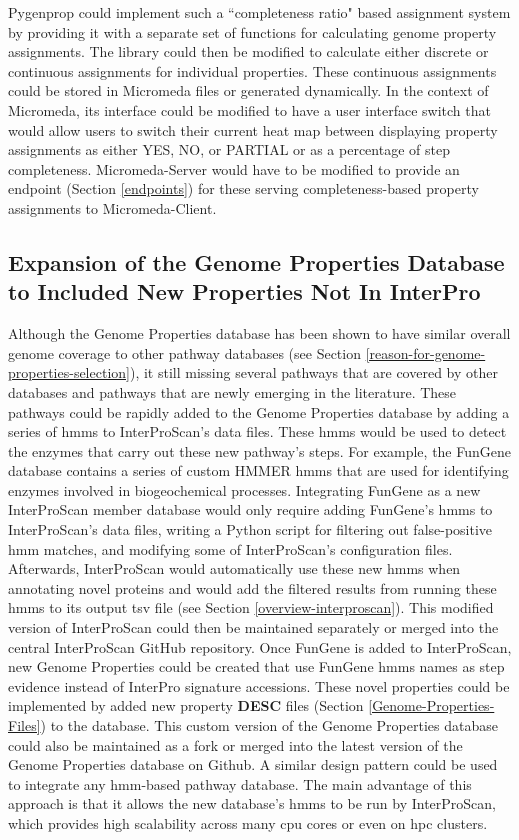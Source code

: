 Pygenprop could implement such a ``completeness ratio" based assignment system by providing it with a separate set of functions for calculating genome property assignments. The library could then be modified to calculate either discrete or continuous assignments for individual properties. These continuous assignments could be stored in Micromeda files or generated dynamically. In the context of Micromeda, its interface could be modified to have a user interface switch that would allow users to switch their current heat map between displaying property assignments as either YES, NO, or PARTIAL or as a percentage of step completeness. Micromeda-Server would have to be modified to provide an endpoint (Section \ref{endpoints}) for these serving completeness-based property assignments to Micromeda-Client.

\subsection{Expansion of the Genome Properties Database to Included New Properties Not In InterPro}

Although the Genome Properties database has been shown to have similar overall genome coverage to other pathway databases (see Section \ref{reason-for-genome-properties-selection}), it still missing several pathways that are covered by other databases and pathways that are newly emerging in the literature. These pathways could be rapidly added to the Genome Properties database by adding a series of \gls{hmm}s \cite{eddy2011accelerated} to InterProScan's data files. These \gls{hmm}s would be used to detect the enzymes that carry out these new pathway's steps. For example, the FunGene \cite{fish2013fungene} database contains a series of custom HMMER \cite{eddy2011accelerated} \gls{hmm}s that are used for identifying enzymes involved in biogeochemical processes. Integrating FunGene as a new InterProScan member database would only require adding FunGene's \gls{hmm}s to InterProScan's data files, writing a Python script for filtering out false-positive \gls{hmm} matches, and modifying some of InterProScan's configuration files. Afterwards, InterProScan would automatically use these new \gls{hmm}s when annotating novel proteins and would add the filtered results from running these \gls{hmm}s to its output \gls{tsv} file (see Section \ref{overview-interproscan}). This modified version of InterProScan could then be maintained separately or merged into the central InterProScan GitHub repository. Once FunGene is added to InterProScan, new Genome Properties could be created that use FunGene \gls{hmm}s names as step evidence instead of InterPro signature accessions. These novel properties could be implemented by added new property \textbf{DESC} files (Section \ref{Genome-Properties-Files}) to the database. This custom version of the Genome Properties database could also be maintained as a fork or merged into the latest version of the Genome Properties database on Github. A similar design pattern could be used to integrate any \gls{hmm}-based pathway database. The main advantage of this approach is that it allows the new database's \gls{hmm}s to be run by InterProScan, which provides high scalability across many \gls{cpu} cores or even on \gls{hpc} clusters.

